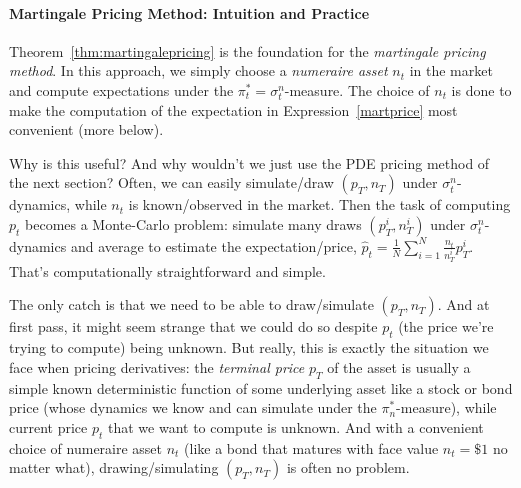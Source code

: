 \documentclass[12pt]{article}
\theoremstyle{plain}
\theoremstyle{definition}
\theoremstyle{remark}
\begin{document}


\paragraph{Martingale Pricing Method: Intuition and Practice}
Theorem~\ref{thm:martingalepricing} is the foundation for the
\emph{martingale pricing method}.
In this approach, we simply choose a \emph{numeraire asset} $n_t$ in the
market and compute expectations under the $\pi_t^*=\sigma_t^n$-measure.
The choice of $n_t$ is done to make the computation of the expectation
in Expression~\ref{martprice} most convenient (more below).

Why is this useful? And why wouldn't we just use the PDE pricing method
of the next section?
Often, we can easily simulate/draw $(p_T,n_T)$ under
$\sigma_t^n$-dynamics, while $n_t$ is known/observed in the market.
Then the task of computing $p_t$ becomes a Monte-Carlo problem:
simulate many draws $(p_T^i,n_T^i)$ under $\sigma_t^n$-dynamics and
average to estimate the expectation/price,
$\hat{p}_t=\frac{1}{N}\sum_{i=1}^N\frac{n_t}{n_T^i}p_T^i$.
That's computationally straightforward and simple.

The only catch is that we need to be able to draw/simulate $(p_T,n_T)$.
And at first pass, it might seem strange that we could do so despite
$p_t$ (the price we're trying to compute) being unknown. But really,
this is exactly the situation we face when pricing derivatives:
the \emph{terminal price} $p_T$ of the asset is
usually a simple known deterministic function of some underlying asset
like a stock or bond price (whose dynamics we know and can simulate
under the $\pi^*_n$-measure),
while current price $p_t$ that we want to compute is unknown.
And with a convenient choice of numeraire asset $n_t$ (like a bond that
matures with face value $n_t=\$1$ no matter what), drawing/simulating
$(p_T,n_T)$ is often no problem.
\end{document}
